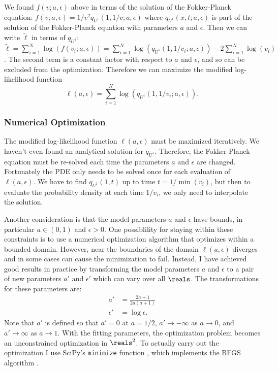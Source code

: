 We found $f(v; a, \epsilon)$ above in terms of the solution of the
Fokker-Planck equation: $f(v; a, \epsilon) = 1/v^2 q_{U^1}(1, 1/v; a,
\epsilon)$ where $q_{U^1}(x, t; a, \epsilon)$ is part of the solution
of the Fokker-Planck equation with parameters $a$ and $\epsilon$. Then
we can write $\tilde{\ell}$ in terms of $q_{U^1}$:
$\tilde{\ell} = \sum_{i=1}^N \log(f(v_i; a, \epsilon)) = \sum_{i=1}^N
\log(q_{U^1}(1, 1/v_i; a, \epsilon)) - 2\sum_{i=1}^N \log(v_i)$. The
second term is a constant factor with respect to $a$ and $\epsilon$,
and so can be excluded from the optimization. Therefore we can
maximize the modified log-likelihood function
\begin{equation}
  \label{eq:mod-log-like}
  \ell(a, \epsilon) = \sum_{i=1}^N \log(q_{U^1}(1, 1/v_i; a, \epsilon)).
\end{equation}

\subsubsection{Numerical Optimization}
\label{sec:numer-optim}

The modified log-likelihood function $\ell(a, \epsilon)$ must be
maximized iteratively. We haven't even found an analytical solution
for $q_{U^1}$. Therefore, the Fokker-Planck equation must be re-solved
each time the parameters $a$ and $\epsilon$ are changed. Fortunately
the PDE only needs to be solved once for each evaluation of
$\ell(a, \epsilon)$. We have to find $q_{U^1}(1, t)$ up to time
$t = 1/\min(v_i)$, but then to evaluate the probability density at
each time $1/v_i$, we only need to interpolate the solution.

Another consideration is that the model parameters $a$ and $\epsilon$
have bounds, in particular $a \in (0, 1)$ and $\epsilon > 0$. One
possiblility for staying within these constraints is to use a
numerical optimization algorithm that optimizes within a bounded
domain. However, near the boundaries of the domain $\ell(a, \epsilon)$
diverges and in some cases can cause the minimization to
fail. Instead, I have achieved good results in practice by
transforming the model parameters $a$ and $\epsilon$ to a pair of new
parameters $a'$ and $\epsilon'$ which can vary over all $\reals$. The
transformations for these parameters are:
\begin{align}
  \label{eq:a-fwd-trns}
  a' &= \frac{2a + 1}{2a(a + 1)} \\
  \label{eq:e-fwd-trns}
  \epsilon' &= \log \epsilon.
\end{align}
Note that $a'$ is defined so that $a'=0$ at $a=1/2$,
$a' \rightarrow -\infty$ as $a \rightarrow 0$, and
$a' \rightarrow \infty$ as $a \rightarrow 1$. With the fitting
parameters, the optimization problem becomes an unconstrained
optimization in $\reals^2$. To actually carry out the optimization I
use SciPy's \verb|minimize| function \cite{Virtanen2020}, which
implements the BFGS algorithm .

